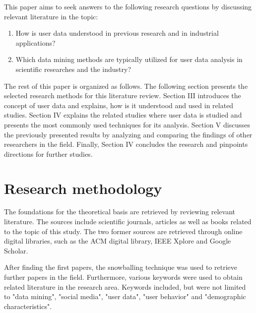 \documentclass[conference]{IEEEtran}
\begin{document}
This paper aims to seek answers to the following research questions by discussing relevant literature in the topic: 

\setdefaultleftmargin{40pt}{}{}{}{}{}
\begin{enumerate}[label=RQ\arabic*:]
	\item How is user data understood in previous research and in industrial applications?
	\item Which data mining methods are typically utilized for user data analysis in scientific researches and the industry?
\end{enumerate}

The rest of this paper is organized as follows. The following section presents the selected research methods for this literature review. Section III introduces the concept of user data and explains, how is it understood and used in related studies. Section IV explains the related studies where user data is studied and presents the most commonly used techniques for its analysis. Section V discusses the previously presented results by analyzing and comparing the findings of other researchers in the field. Finally, Section IV concludes the research and pinpoints directions for further studies. 

\section{Research methodology}
The foundations for the theoretical basis are retrieved by reviewing relevant literature. The sources include scientific journals, articles as well as books related to the topic of this study. The two former sources are retrieved through online digital libraries, such as the ACM digital library, IEEE Xplore and Google Scholar. 

After finding the first papers, the snowballing technique was used to retrieve further papers in the field. Furthermore, various keywords were used to obtain related literature in the research area. Keywords included, but were not limited to "data mining", "social media", "user data", "user behavior" and "demographic characteristics". 

\end{document}
